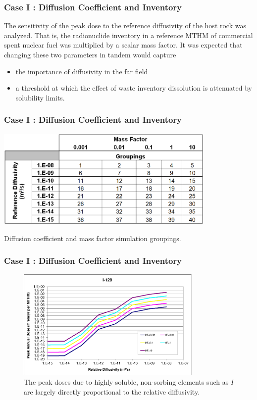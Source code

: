 
\begin{frame}[c]
  \frametitle{Case I : Diffusion Coefficient and Inventory}
The sensitivity of the peak dose to the reference diffusivity of the 
host rock was analyzed. 
That is, the radionuclide inventory in a reference \gls{MTHM} of commercial spent nuclear fuel was multiplied by a scalar mass factor.  
It was expected that changing these two parameters in tandem would capture 
\begin{itemize}
  \item the importance of diffusivity in the far field 
  \item a threshold at which the effect of waste inventory dissolution is attenuated by solubility limits.
\end{itemize}
\end{frame}

\begin{frame}[c]
  \frametitle{Case I : Diffusion Coefficient and Inventory}

\begin{table}[hbp!]
\centering
\includegraphics[width=0.8\textwidth]{DiffCoeffAndInvEBSFail/DiffCoeffAndInvGroups.eps}
\caption{Diffusion coefficient and mass factor simulation groupings.}
\label{tab:DiffCoeffAndInvGroups}
\end{table}
\end{frame}

\begin{frame}[c]
  \frametitle{Case I : Diffusion Coefficient and Inventory}
\begin{figure}[ht]
\centering
\includegraphics[width=0.8\textwidth]{./DiffCoeffAndInvEBSFail/I-129.eps}
\caption{The peak doses due to highly soluble, non-sorbing elements such as $I$ 
are largely directly proportional to the relative diffusivity.  }
\label{fig:DCInvI129}
\end{figure}
\end{frame}

